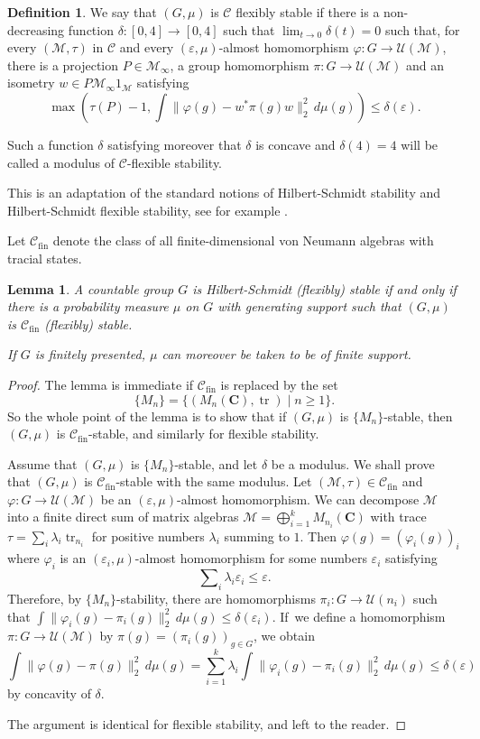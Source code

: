\documentclass[10pt]{amsart}
\theoremstyle{plain}
\newtheorem{lemma}[theorem]{Lemma}
\theoremstyle{definition}
\newtheorem{definition}[theorem]{Definition}
\newcommand{\C}{\mathbf{C}}
\newcommand{\cM}{\mathcal{M}}
\newcommand{\vn}{\mathcal{C}}
\newcommand{\cU}{\mathcal{U}}
\DeclareMathOperator{\tr}{tr}
\numberwithin{equation}{section}
\begin{document}
\begin{definition}\label{def:flexible_stability}
We say that $(G,\mu)$ is $\vn$ flexibly stable if there is a non-decreasing function $\delta:[0,4]\to [0,4]$ such that $\lim_{t \to 0} \delta(t) = 0$ such that, for every $(\cM,\tau)$ in $\vn$ and every $(\varepsilon,\mu)$-almost homomorphism $\varphi: G \to \cU(\cM)$, there is a projection $P \in \cM_\infty$, a group homomorphism $\pi:G \to \cU(\cM)$ and an isometry $w \in P \cM_\infty 1_\cM$ satisfying
\[
\max\left(\tau(P)-1, \int \|\varphi(g) - w^*\pi(g)w\|_2^2 \,d\mu(g)\right) \leq \delta(\varepsilon).
\]

Such a function $\delta$ satisfying moreover that $\delta$ is concave and $\delta(4)=4$ will be called a modulus of $\vn$-flexible stability.
\end{definition}
This is an adaptation of the standard notions of Hilbert-Schmidt stability and Hilbert-Schmidt flexible stability, see for example \cite{Ioana2}.

Let $\vn_{\mathrm{fin}}$ denote the class of all finite-dimensional von Neumann algebras with tracial states.
\begin{lemma} A countable group $G$ is Hilbert-Schmidt (flexibly) stable if and only if there is a probability measure $\mu$ on $G$ with generating support such that $(G,\mu)$ is $\vn_{\mathrm{fin}}$ (flexibly) stable.

If $G$ is finitely presented, $\mu$ can moreover be taken to be of finite support.
\end{lemma}
\begin{proof}
The lemma is immediate if $\vn_{\mathrm{fin}}$ is replaced by the set \[
\{M_n\} = \{(M_n(\C),\tr) \mid n\geq 1\}.
\] So the whole point of the lemma is to show that if $(G,\mu)$ is $\{M_n\}$-stable, then $(G,\mu)$ is $\vn_{\mathrm{fin}}$-stable, and similarly for flexible stability.

Assume that $(G,\mu)$ is $\{M_n\}$-stable, and let $\delta$ be a modulus. We shall prove that $(G,\mu)$ is $\vn_{\mathrm{fin}}$-stable with the same modulus. Let $(\cM,\tau) \in \vn_{\mathrm{fin}}$ and $\varphi:G\to \cU(\cM)$ be an $(\varepsilon,\mu)$-almost homomorphism. We can decompose $\cM$ into a finite direct sum of matrix algebras $\cM = \bigoplus_{i=1}^k M_{n_i}(\C)$ with trace $\tau = \sum_i \lambda_i \tr_{n_i}$ for positive numbers $\lambda_i$ summing to $1$. Then $\varphi(g) = (\varphi_i(g))_i$ where $\varphi_i$ is an $(\varepsilon_i,\mu)$-almost homomorphism for some numbers $\varepsilon_i$ satisfying
\[
\sum\nolimits_i \lambda_i\varepsilon_i\leq\varepsilon.
\]
Therefore, by $\{M_n\}$-stability, there are homomorphisms $\pi_i \colon G\to\cU(n_i)$ such that $\int\|\varphi_i(g) - \pi_i(g)\|_2^2\,d\mu(g) \leq \delta(\varepsilon_i)$. If~we define a homomorphism $\pi:G\to \cU(\cM)$ by $\pi(g) = (\pi_i(g))_{g\in G}$, we obtain
\[
\int \|\varphi(g) - \pi(g)\|_2^2 \,d\mu(g) = \sum_{i=1}^k\lambda_i \int\|\varphi_i(g) - \pi_i(g)\|_2^2\,d\mu(g) \leq \delta(\varepsilon)
\]
by concavity of $\delta$.

The argument is identical for flexible stability, and left to the reader.
\end{proof}
\end{document}
